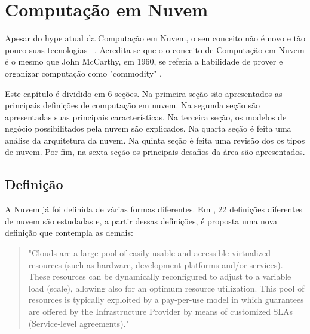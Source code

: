 \chapter{Computação em Nuvem}
Apesar do hype  atual da Computação em Nuvem,
o seu conceito não é novo e tão pouco suas
tecnologias~\cite{CloudUncovered:2012} . Acredita-se que o o conceito de Computação em
Nuvem é o mesmo que John McCarthy, em 1960, se referia a habilidade de prover
e organizar computação como "commodity"  . 


Este capítulo é dividido em 6 seções. Na primeira seção são apresentados as
principais definições de computação em nuvem. Na segunda seção são
apresentadas suas principais características. Na terceira seção, os modelos de
negócio possibilitados pela nuvem são explicados. Na quarta seção é feita uma
análise da arquitetura da nuvem. Na quinta seção é feita uma revisão dos os
tipos de nuvem. Por fim, na sexta seção os principais desafios da área são
apresentados.  

\section{Definição} \label{cloud:def}

A Nuvem já foi definida de várias formas diferentes. Em
\cite{CloudDefinition:2009} , 22  definições diferentes de nuvem são estudadas e, a partir dessas definições, é proposta uma nova definição que contempla as demais:
	
	\begin{quotation}
		"Clouds are a large pool of easily usable and accessible virtualized resources (such as hardware, development platforms and/or services). These resources can be dynamically reconfigured to adjust to a variable load (scale), allowing also for an optimum resource utilization. This pool of resources is typically exploited by a pay-per-use model in which guarantees are offered by the Infrastructure Provider by means of customized SLAs (Service-level agreements)."
	\end{quotation}
	
